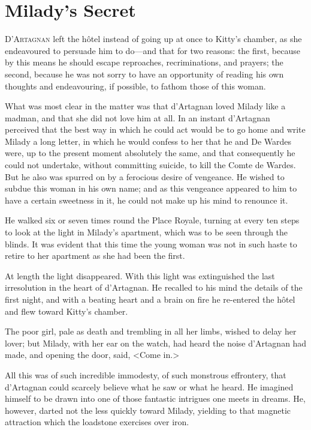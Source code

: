 
\chapter{Milady's Secret} 
	
\lettrine[]{D}{'Artagnan} left the hôtel instead of going up at once to Kitty's chamber, as she endeavoured to persuade him to do---and that for two reasons: the first, because by this means he should escape reproaches, recriminations, and prayers; the second, because he was not sorry to have an opportunity of reading his own thoughts and endeavouring, if possible, to fathom those of this woman. 

What was most clear in the matter was that d'Artagnan loved Milady like a madman, and that she did not love him at all. In an instant d'Artagnan perceived that the best way in which he could act would be to go home and write Milady a long letter, in which he would confess to her that he and De Wardes were, up to the present moment absolutely the same, and that consequently he could not undertake, without committing suicide, to kill the Comte de Wardes. But he also was spurred on by a ferocious desire of vengeance. He wished to subdue this woman in his own name; and as this vengeance appeared to him to have a certain sweetness in it, he could not make up his mind to renounce it. 

He walked six or seven times round the Place Royale, turning at every ten steps to look at the light in Milady's apartment, which was to be seen through the blinds. It was evident that this time the young woman was not in such haste to retire to her apartment as she had been the first. 

At length the light disappeared. With this light was extinguished the last irresolution in the heart of d'Artagnan. He recalled to his mind the details of the first night, and with a beating heart and a brain on fire he re-entered the hôtel and flew toward Kitty's chamber. 

The poor girl, pale as death and trembling in all her limbs, wished to delay her lover; but Milady, with her ear on the watch, had heard the noise d'Artagnan had made, and opening the door, said, <Come in.> 

All this was of such incredible immodesty, of such monstrous effrontery, that d'Artagnan could scarcely believe what he saw or what he heard. He imagined himself to be drawn into one of those fantastic intrigues one meets in dreams. He, however, darted not the less quickly toward Milady, yielding to that magnetic attraction which the loadstone exercises over iron. 

